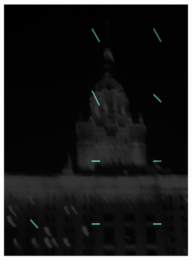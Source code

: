 \begin{figure} [H]
\begin{minipage}[h]{0.28\linewidth}
\includegraphics[width=1\linewidth, left]{pics/fields/ceps.png} \\ 
\end{minipage}
\hfill
\begin{minipage}[h]{0.28\linewidth}

\end{minipage}
\end{figure}
